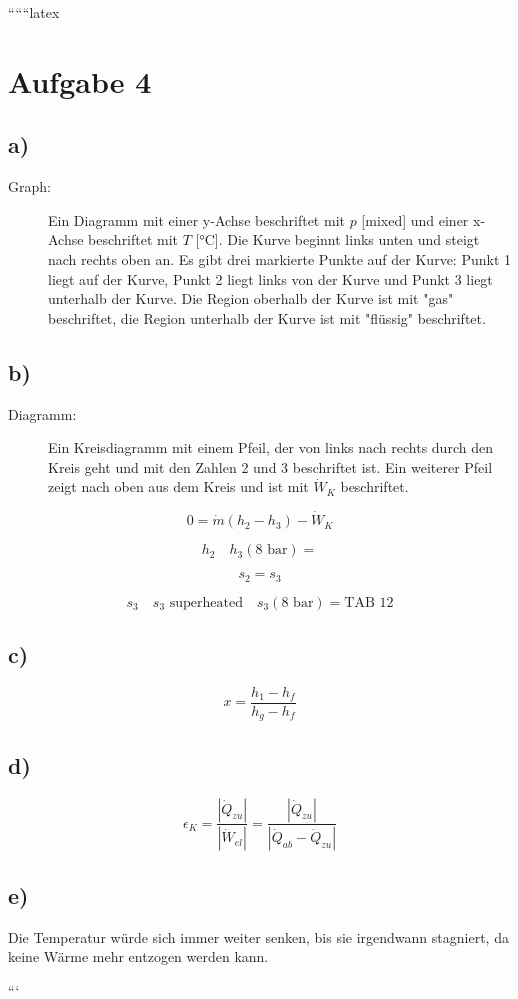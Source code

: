 
``````latex


\section*{Aufgabe 4}

\subsection*{a)}

\begin{description}
    \item[Graph:] Ein Diagramm mit einer y-Achse beschriftet mit \( p \) [mixed] und einer x-Achse beschriftet mit \( T \) [°C]. Die Kurve beginnt links unten und steigt nach rechts oben an. Es gibt drei markierte Punkte auf der Kurve: Punkt 1 liegt auf der Kurve, Punkt 2 liegt links von der Kurve und Punkt 3 liegt unterhalb der Kurve. Die Region oberhalb der Kurve ist mit "gas" beschriftet, die Region unterhalb der Kurve ist mit "flüssig" beschriftet.
\end{description}

\subsection*{b)}

\begin{description}
    \item[Diagramm:] Ein Kreisdiagramm mit einem Pfeil, der von links nach rechts durch den Kreis geht und mit den Zahlen 2 und 3 beschriftet ist. Ein weiterer Pfeil zeigt nach oben aus dem Kreis und ist mit \( \dot{W}_K \) beschriftet.
\end{description}

\[
0 = \dot{m} (h_2 - h_3) - \dot{W}_K
\]

\[
h_2 \quad h_3(8 \text{ bar}) =
\]

\[
s_2 = s_3
\]

\[
s_3 \quad s_3 \text{ superheated} \quad s_3(8 \text{ bar}) = \text{TAB 12}
\]

\subsection*{c)}

\[
x = \frac{h_1 - h_f}{h_g - h_f}
\]

\subsection*{d)}

\[
\epsilon_K = \frac{|\dot{Q}_{zu}|}{|\dot{W}_{el}|} = \frac{|\dot{Q}_{zu}|}{|\dot{Q}_{ab} - \dot{Q}_{zu}|}
\]

\subsection*{e)}

Die Temperatur würde sich immer weiter senken, bis sie irgendwann stagniert, da keine Wärme mehr entzogen werden kann.

```